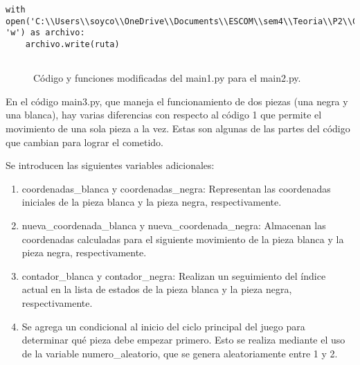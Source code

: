 \begin{enumerate}
\begin{lstlisting}
with open('C:\\Users\\soyco\\OneDrive\\Documents\\ESCOM\\sem4\\Teoria\\P2\\Chess\\output\\ruta_blanca.txt', 'w') as archivo:
    archivo.write(ruta)


\end{lstlisting}
\begin{figure}[h]
\begin{center}
\end{center}
\caption{Código y funciones modificadas del main1.py para el main2.py.}
\label{fig:imagen}
\end{figure}

En el código main3.py, que maneja el funcionamiento de dos piezas (una negra y una blanca), hay varias diferencias con respecto al código 1 que permite el movimiento de una sola pieza a la vez. Estas son algunas de las partes del código que cambian para lograr el cometido.\newline

Se introducen las siguientes variables adicionales:\newline
\begin{enumerate}
    
    \item coordenadas\_blanca y coordenadas\_negra: Representan las coordenadas iniciales de la pieza blanca y la pieza negra, respectivamente.\newline
    \item nueva\_coordenada\_blanca y nueva\_coordenada\_negra: Almacenan las coordenadas calculadas para el siguiente movimiento de la pieza blanca y la pieza negra, respectivamente.\newline
    \item contador\_blanca y contador\_negra: Realizan un seguimiento del índice actual en la lista de estados de la pieza blanca y la pieza negra, respectivamente.\newline
    \item Se agrega un condicional al inicio del ciclo principal del juego para determinar qué pieza debe empezar primero. Esto se realiza mediante el uso de la variable numero\_aleatorio, que se genera aleatoriamente entre 1 y 2.\newline
    

\end{enumerate}
\end{enumerate}
